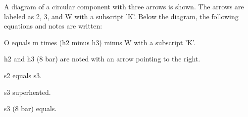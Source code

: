 A diagram of a circular component with three arrows is shown. The arrows are labeled as 2, 3, and W with a subscript 'K'. Below the diagram, the following equations and notes are written:

O equals m times (h2 minus h3) minus W with a subscript 'K'.

h2 and h3 (8 bar) are noted with an arrow pointing to the right.

s2 equals s3.

s3 superheated.

s3 (8 bar) equals.
